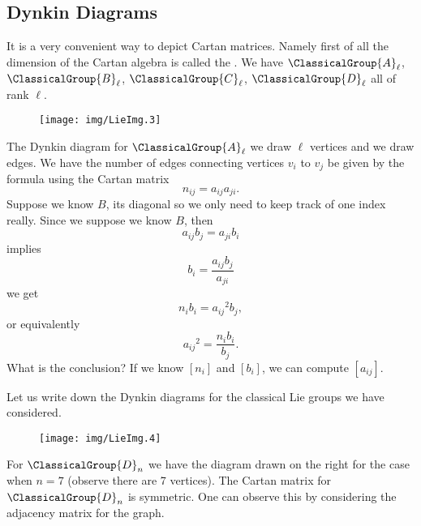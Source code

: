 \subsection{Dynkin Diagrams}
It is a very convenient way to depict Cartan matrices. Namely %
first of all the dimension of the Cartan algebra is called the
. We have $\ClassicalGroup{A}_{\ell}$,
$\ClassicalGroup{B}_{\ell}$, $\ClassicalGroup{C}_{\ell}$,
$\ClassicalGroup{D}_{\ell}$ all of rank $\ell$. 

\begin{wrapfigure}[2]{r}{4cm}
  \vspace{-20pt}
  \begin{center}
    \texttt{[image: img/LieImg.3]}
  \end{center}
  \vspace{-20pt}
\end{wrapfigure}
The Dynkin diagram for $\ClassicalGroup{A}_{\ell}$ we draw $\ell$
vertices and we draw edges. We have the number of edges connecting vertices
$v_{i}$ to $v_{j}$ be given by the formula using the Cartan matrix 
\begin{equation}
n_{ij}=a_{ij}a_{ji}.
\end{equation}
Suppose we know $B$, its diagonal so we only need to keep track
of one index really. Since we suppose we know $B$, then
\begin{equation}
a_{ij}b_{j}=a_{ji}b_{i}
\end{equation}
implies
\begin{equation}
b_{i} = \frac{a_{ij}b_{j}}{a_{ji}}
\end{equation}
we get
\begin{equation}
n_{i}b_{i} = {a_{ij}}^{2}b_{j},
\end{equation}
or equivalently
\begin{equation}
{a_{ij}}^{2} = \frac{n_{i}b_{i}}{b_{j}}.
\end{equation}
What is the conclusion? If we know $[n_{i}]$ and $[b_{i}]$, we can
compute $[a_{ij}]$. 

Let us write down the Dynkin diagrams for the classical Lie
groups we have considered.
\begin{wrapfigure}[4]{r}{4.5cm}
  \vspace{-20pt}
  \begin{center}
    \texttt{[image: img/LieImg.4]}
  \end{center}
  \vspace{-20pt}
\end{wrapfigure}
\noindent{}For $\ClassicalGroup{D}_{n}$ we have the diagram drawn
on the right for the case when $n=7$ (observe there are 7
vertices). The Cartan matrix for $\ClassicalGroup{D}_{n}$ is
symmetric. One can observe this by considering the adjacency
matrix for the graph.

